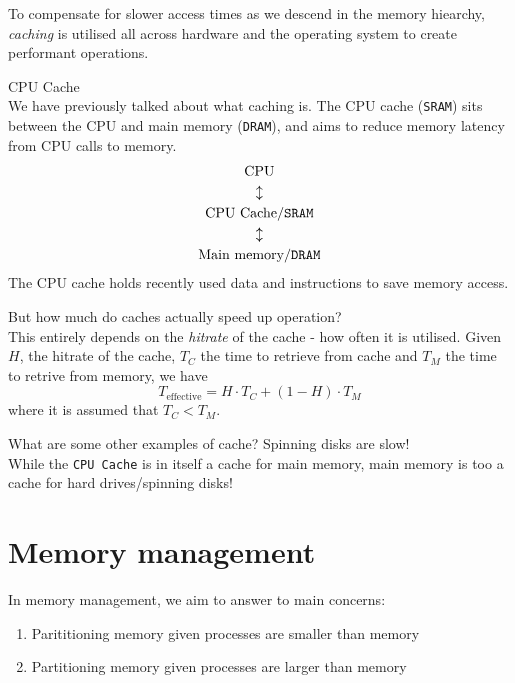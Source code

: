 \documentclass[journal, letterpaper]{IEEEtran}
\begin{document}
To compensate for slower access times as we descend in the memory hiearchy, \textit{caching} is utilised all across hardware and the operating system to create performant operations.
\begin{theory}{CPU Cache} \\
    We have previously talked about what caching is. The CPU cache (\verb|SRAM|) sits between the CPU and main memory (\verb|DRAM|), and aims to reduce memory latency from CPU calls to memory.
    \begin{gather}
        \text{CPU} \\
        \updownarrow \\
        \text{CPU Cache/\texttt{SRAM}} \\
        \updownarrow \\
        \text{Main memory/\texttt{DRAM}}
    \end{gather}
    The CPU cache holds recently used data and instructions to save memory access.
\end{theory}
\begin{aside}{But how much do caches actually speed up operation?} \\
    This entirely depends on the \textit{hitrate} of the cache - how often it is utilised. Given $H$, the hitrate of the cache, $T_C$ the time to retrieve from cache and $T_M$ the time to retrive from memory, we have
    $$ T_{\text{effective}} = H \cdot T_C + (1 - H) \cdot T_M$$
    where it is assumed that $T_C < T_M$.
\end{aside}
\begin{example}{What are some other examples of cache? Spinning disks are slow!} \\
    While the \verb|CPU Cache| is in itself a cache for main memory, main memory is too a cache for hard drives/spinning disks!
\end{example}

\section{Memory management}
In memory management, we aim to answer to main concerns:
\begin{enumerate}
    \item Parititioning memory given processes are smaller than memory
    \item Partitioning memory given processes are larger than memory
\end{enumerate}
\end{document}
